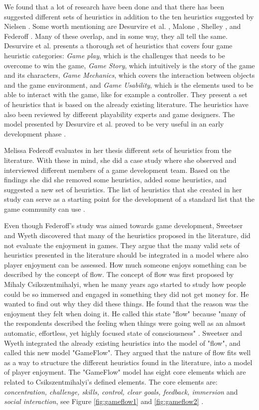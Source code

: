 We found that a lot of research have been done and that there has been suggested different sets of heuristics in addition to the ten heuristics suggested by Nielsen \cite{nielsen2005ten}. Some worth mentioning are Desurvire et al. \cite{desurvire}, Malone \cite{malone}, Shelley \cite{shelley}, and Federoff \cite{federoff}. Many of these overlap, and in some way, they all tell the same.  Desurvire et al. presents a thorough set of heuristics that covers four game heuristic categories:  \emph{Game play}, which is the challenges that needs to be overcome to win the game, \emph{Game Story}, which intuitively is the story of the game and its characters, \emph{Game Mechanics}, which covers the interaction between objects and the game environment, and  \emph{Game Usability}, which is the elements used to be able to interact with the game, like for example a controller. They present a set of heuristics that is based on the already existing literature. The heuristics have also been reviewed by different playability experts and game designers. The model presented by Desurvire et al. proved to be very useful in an early development phase \cite{desurvire}.

Melissa Federoff evaluates in her thesis different sets of heuristics from the literature. With these in mind, she did a case study where she observed and interviewed different members of a game development team. Based on the findings she did she removed some heuristics, added some heuristics, and  suggested a new set of heuristics. The list of heuristics that she created in her study can serve as a starting point for the development of a standard list that the game community can use  \cite{federoff}. 

Even though Federoff's study was aimed towards game development, Sweetser and Wyeth discovered that many of the heuristics proposed in the literature, did not evaluate the enjoyment in games. They argue that the many valid sets of heuristics presented in the literature should be integrated in a model where also player enjoyment can be assessed. How much someone enjoys something can be described by the concept of flow. The concept of flow was first proposed by  Mihaly Csikszentmihalyi, when he many years ago started  to study how people could be so immersed and engaged in something they did not get money for. He wanted to find out why they did these things. He found that the reason was the enjoyment they felt when doing it. He called this state "flow" because "many of the respondents described the feeling when things were going well as an almost automatic, effortless, yet highly focused state of consciousness" \cite{flow}.  Sweetser and Wyeth integrated the already existing heuristics into the model of "flow", and called this new model "GameFlow".  They argued that the nature of flow fits well as a way to structure the different heuristics found in the literature, into a model of player enjoyment. The "GameFlow" model has eight core elements which are related to Csikszentmihalyi's defined elements. The core elements are: \emph{concentration, challenge, skills, control, clear goals, feedback, immersion} and \emph{social interaction}, see Figure \ref{fig:gameflow1} and \ref{fig:gameflow2} \cite{sweetser}. 

